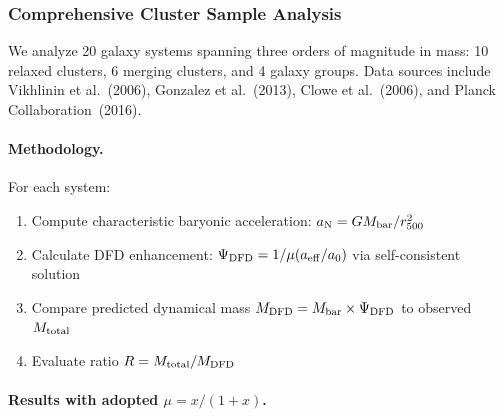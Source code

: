 \subsubsection{Comprehensive Cluster Sample Analysis}

We analyze 20 galaxy systems spanning three orders of magnitude in mass: 10 relaxed clusters, 6 merging clusters, and 4 galaxy groups. Data sources include Vikhlinin et al.~(2006), Gonzalez et al.~(2013), Clowe et al.~(2006), and Planck Collaboration~(2016).

\paragraph{Methodology.}
For each system:
\begin{enumerate}
\item Compute characteristic baryonic acceleration: $a_{\rm N} = GM_{\rm bar}/r_{500}^2$
\item Calculate DFD enhancement: $\Psi_{\rm DFD} = 1/\mu(a_{\rm eff}/a_0)$ via self-consistent solution
\item Compare predicted dynamical mass $M_{\rm DFD} = M_{\rm bar} \times \Psi_{\rm DFD}$ to observed $M_{\rm total}$
\item Evaluate ratio $R = M_{\rm total}/M_{\rm DFD}$
\end{enumerate}

\paragraph{Results with adopted $\mu = x/(1+x)$.}

